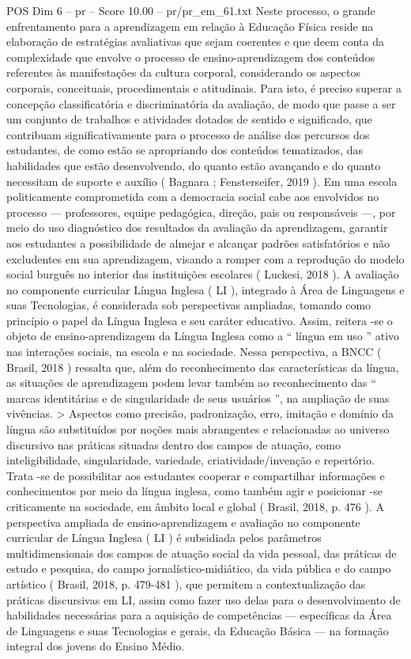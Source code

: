 \begin{textsample}{POS Dim 6 – pr – Score 10.00 – pr/pr\_em\_61.txt}
Neste processo, o grande enfrentamento para a aprendizagem em relação à Educação Física reside na elaboração de estratégias avaliativas que sejam coerentes e que deem conta da complexidade que envolve o processo de ensino-aprendizagem dos conteúdos referentes às manifestações da cultura corporal, considerando os aspectos corporais, conceituais, procedimentais e atitudinais.
Para isto, é preciso superar a concepção classificatória e discriminatória da avaliação, de modo que passe a ser um conjunto de trabalhos e atividades dotados de sentido e significado, que contribuam significativamente para o processo de análise dos percursos dos estudantes, de como estão se apropriando dos conteúdos tematizados, das habilidades que estão desenvolvendo, do quanto estão avançando e do quanto necessitam de suporte e auxílio ( Bagnara ; Fensterseifer, 2019 ).
Em uma escola politicamente comprometida com a democracia social cabe aos envolvidos no processo — professores, equipe pedagógica, direção, pais ou responsáveis —, por meio do uso diagnóstico dos resultados da avaliação da aprendizagem, garantir aos estudantes a possibilidade de almejar e alcançar padrões satisfatórios e não excludentes em sua aprendizagem, visando a romper com a reprodução do modelo social burguês no interior das instituições escolares ( Luckesi, 2018 ).
A avaliação no componente curricular Língua Inglesa ( LI ), integrado à Área de Linguagens e suas Tecnologias, é considerada sob perspectivas ampliadas, tomando como princípio o papel da Língua Inglesa e seu caráter educativo.
Assim, reitera -se o objeto de ensino-aprendizagem da Língua Inglesa como a “ língua em uso ” ativo nas interações sociais, na escola e na sociedade.
Nessa perspectiva, a BNCC ( Brasil, 2018 ) ressalta que, além do reconhecimento das características da língua, as situações de aprendizagem podem levar também ao reconhecimento das “ marcas identitárias e de singularidade de seus usuários ”, na ampliação de suas vivências. > Aspectos como precisão, padronização, erro, imitação e domínio da língua são substituídos por noções mais abrangentes e relacionadas ao universo discursivo nas práticas situadas dentro dos campos de atuação, como inteligibilidade, singularidade, variedade, criatividade/invenção e repertório.
Trata -se de possibilitar aos estudantes cooperar e compartilhar informações e conhecimentos por meio da língua inglesa, como também agir e posicionar -se criticamente na sociedade, em âmbito local e global ( Brasil, 2018, p. 476 ).
A perspectiva ampliada de ensino-aprendizagem e avaliação no componente curricular de Língua Inglesa ( LI ) é subsidiada pelos parâmetros multidimensionais dos campos de atuação social da vida pessoal, das práticas de estudo e pesquisa, do campo jornalístico-midiático, da vida pública e do campo artístico ( Brasil, 2018, p. 479-481 ), que permitem a contextualização das práticas discursivas em LI, assim como fazer uso delas para o desenvolvimento de habilidades necessárias para a aquisição de competências — específicas da Área de Linguagens e suas Tecnologias e gerais, da Educação Básica — na formação integral dos jovens do Ensino Médio.

\end{textsample}
